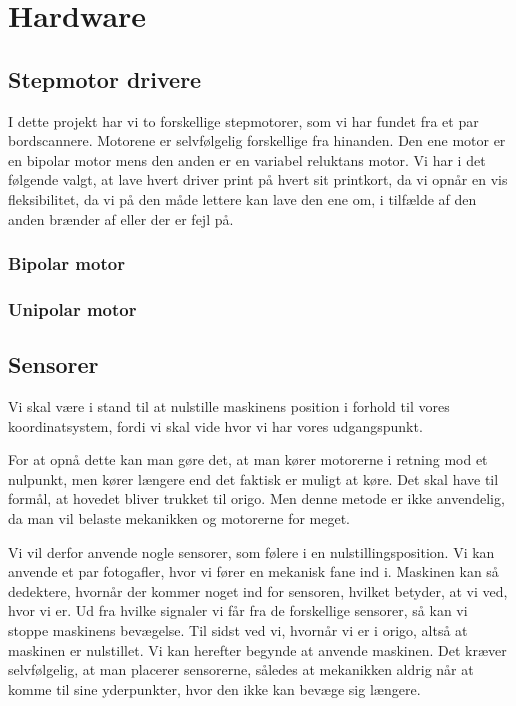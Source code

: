 \chapter[Design af hardware]{Hardware}


\section{Stepmotor drivere}
I dette projekt har vi to forskellige stepmotorer, som vi har fundet
fra et par bordscannere. Motorene er selvfølgelig forskellige fra
hinanden. Den ene motor er en bipolar motor mens den anden er en
variabel reluktans motor. Vi har i det følgende valgt, at lave hvert
driver print på hvert sit printkort, da vi opnår en vis fleksibilitet,
da vi på den måde lettere kan lave den ene om, i tilfælde af den anden
brænder af eller der er fejl på. 

\subsection{Bipolar motor}

\subsection{Unipolar motor}

\section{Sensorer}
Vi skal være i stand til at nulstille maskinens position i forhold til
vores koordinatsystem, fordi vi skal vide hvor vi har vores
udgangspunkt.

For at opnå dette kan man gøre det, at man kører motorerne i retning
mod et nulpunkt, men kører længere end det faktisk er muligt at
køre. Det skal have til formål, at hovedet bliver trukket til
origo. Men denne metode er ikke anvendelig, da man vil belaste
mekanikken og motorerne for meget.

Vi vil derfor anvende nogle sensorer, som følere i en
nulstillingsposition. Vi kan anvende et par fotogafler, hvor vi fører
en mekanisk fane ind i. Maskinen kan så dedektere, hvornår der kommer
noget ind for sensoren, hvilket betyder, at vi ved, hvor vi er. Ud fra
hvilke signaler vi får fra de forskellige sensorer, så kan vi stoppe
maskinens bevægelse. Til sidst ved vi, hvornår vi er i origo, altså at
maskinen er nulstillet. Vi kan herefter begynde at anvende
maskinen. Det kræver selvfølgelig, at man placerer sensorerne, således
at mekanikken aldrig når at komme til sine yderpunkter, hvor den ikke
kan bevæge sig længere.

